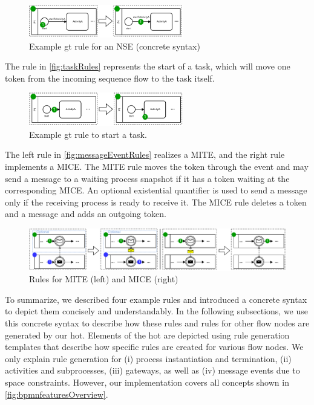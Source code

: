 \documentclass[runningheads]{llncs}
\begin{document}
\begin{figure}[ht]
    \centering
  \includegraphics[width=0.6\textwidth]{images/rule_concrete.pdf}
  \caption{Example \gls*{gt} rule for an NSE (concrete syntax)}
  \label{fig:gtRuleConcrete}
\end{figure}

The rule in \autoref{fig:taskRules} represents the start of a task, which will move one token from the incoming sequence flow to the task itself.

\begin{figure}[ht]
    \centering
    \includegraphics[width=0.6\textwidth]{images/bpmn_semantics-rules.pdf}
    \caption{Example \gls*{gt} rule to start a task.}
    \label{fig:taskRules}
\end{figure}

The left rule in \autoref{fig:messageEventRules} realizes a MITE, and the right rule implements a MICE.
The MITE rule moves the token through the event and may send a message to a waiting process snapshot if it has a token waiting at the corresponding MICE.
An optional existential quantifier \cite{rensinkNestedQuantificationGraph2006} is used to send a message only if the receiving process is ready to receive it.
The MICE rule deletes a token and a message and adds an outgoing token.

\begin{figure}[ht]
    \centering
    \includegraphics[width=1\textwidth]{images/bpmn_semantics-message-events.pdf}
    \caption{Rules for MITE (left) and MICE (right)}
    \label{fig:messageEventRules}
\end{figure}

To summarize, we described four example rules and introduced a concrete syntax to depict them concisely and understandably.
In the following subsections, we use this concrete syntax to describe how these rules and rules for other flow nodes are generated by our \gls*{hot}.
Elements of the \gls*{hot} are depicted using rule generation templates that describe how specific rules are created for various flow nodes.
We only explain rule generation for (i) process instantiation and termination, (ii) activities and subprocesses, (iii) gateways, as well as (iv) message events due to space constraints.
However, our implementation covers all concepts shown in \autoref{fig:bpmnfeaturesOverview}.
\end{document}
